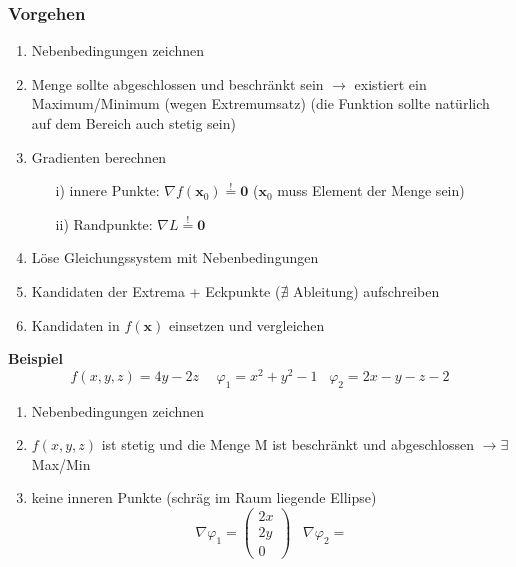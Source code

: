 \documentclass[8pt, a4paper, landscape, fleqn]{scrartcl}
\newenvironment {example}
				{\begin{itshape} \begin{small}}
				{\end{small} \end{itshape}}
\begin{document}
\begin{multicols*}{3}
				\subsubsection{Vorgehen}
					\begin{enumerate}
						\item Nebenbedingungen zeichnen
						\item Menge sollte abgeschlossen und beschränkt sein $\rightarrow$ existiert ein Maximum/Minimum (wegen Extremumsatz) (die Funktion sollte natürlich auf dem Bereich auch stetig sein)
						\item Gradienten berechnen
						\begin{itemize}
							\item[i)] innere Punkte: $\nabla f(\textbf{x}_0)\overset{!}{=} \textbf{0}$ ($\textbf{x}_0$ muss Element der Menge sein)
							\item[ii)] Randpunkte: $\nabla L\overset{!}{=} \textbf{0}$ 
						\end{itemize}
						\item Löse Gleichungssystem mit Nebenbedingungen
						\item Kandidaten der Extrema + Eckpunkte ($\nexists$ Ableitung) aufschreiben
						\item Kandidaten in $f(\textbf{x})$ einsetzen und vergleichen
					\end{enumerate}
					\begin{example}
						\textbf{Beispiel}
						\begin{equation*}
							f(x, y, z)=4y-2z \hspace{15pt} \varphi_1=x^2+y^2-1 \hspace{10pt} \varphi_2=2x-y-z-2
						\end{equation*}
						\begin{enumerate}
							\item Nebenbedingungen zeichnen
							\item $f(x, y, z)$ ist stetig und die Menge M ist beschränkt und abgeschlossen $\rightarrow \exists$ Max/Min
							\item keine inneren Punkte (schräg im Raum liegende Ellipse)
							\begin{equation*}
								\nabla \varphi_1=
								\begin{pmatrix}
									2x\\ 2y\\ 0
								\end{pmatrix}
								\hspace{10pt} \nabla \varphi_2=

\end{equation*}
\end{enumerate}
\end{example}
\end{multicols*}
\end{document}
